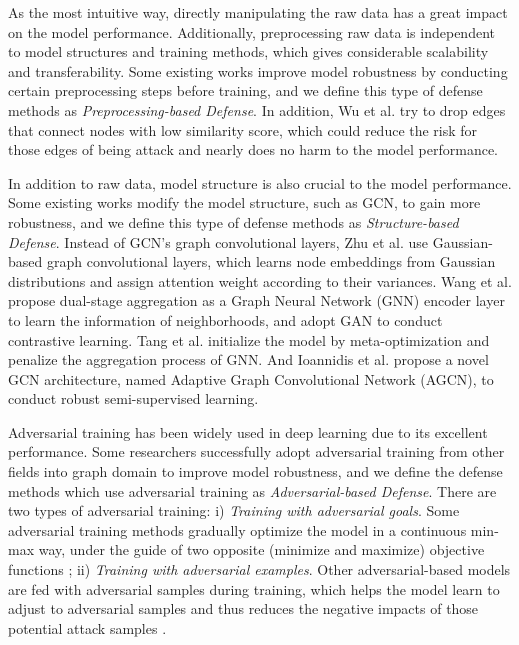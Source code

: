  As the most intuitive way, directly manipulating the raw data has a great impact on the model performance. Additionally, preprocessing raw data is independent to model structures and training methods, which gives considerable scalability and transferability. Some existing works\cite{wu2019adversarial} improve model robustness by conducting certain preprocessing steps before training, and we define this type of defense methods as \emph{Preprocessing-based Defense}. In addition, Wu et al. \cite{wu2019adversarial} try to drop edges that connect nodes with low similarity score, which could reduce the risk for those edges of being attack and nearly does no harm to the model performance.

 In addition to raw data, model structure is also crucial to the model performance. Some existing works modify the model structure, such as GCN, to gain more robustness, and we define this type of defense methods as \emph{Structure-based Defense}. Instead of GCN's graph convolutional layers, Zhu et al. \cite{zhu2019robust} use Gaussian-based graph convolutional layers, which learns node embeddings from Gaussian distributions and assign attention weight according to their variances. Wang et al. \cite{wang2019adversarial} propose dual-stage aggregation as a Graph Neural Network (GNN) encoder layer to learn the information of neighborhoods, and adopt GAN \cite{goodfellow2014generative} to conduct contrastive learning. Tang et al. \cite{tang2019robust} initialize the model by meta-optimization and penalize the aggregation process of GNN. And Ioannidis et al. \cite{ioannidis2019edge} propose a novel GCN architecture, named Adaptive Graph Convolutional Network (AGCN), to conduct robust semi-supervised learning.

 Adversarial training has been widely used in deep learning due to its excellent performance. Some researchers successfully adopt adversarial training from other fields into graph domain to improve model robustness, and we define the defense methods which use adversarial training as \emph{Adversarial-based Defense}. There are two types of adversarial training: i) \emph{Training with adversarial goals}. Some adversarial training methods gradually optimize the model in a continuous min-max way, under the guide of two opposite (minimize and maximize) objective functions \cite{xu2019topology, sun2019virtual, feng2019graph}; ii) \emph{Training with adversarial examples}. Other adversarial-based models are fed with adversarial samples during training, which helps the model learn to adjust to adversarial samples and thus reduces the negative impacts of those potential attack samples \cite{chen2019can, wang2019graphdefense, deng2019batch, he2018adversarial}.



